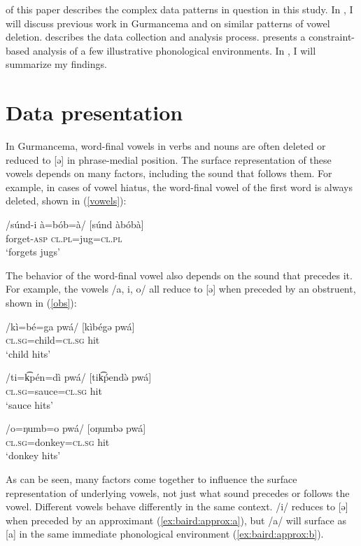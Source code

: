 \documentclass[output=paper,newtxmath,modfonts,nonflat,draftmode]{langsci/langscibook}
\begin{document}
 of this paper describes the complex data patterns in question in this study. In , I will discuss previous work in Gurmancema and on similar patterns 
of vowel deletion.  describes the data collection and analysis process.  presents a constraint-based analysis of a few illustrative phonological environments. In , I will summarize my findings. 

\section{Data presentation} \label{data}\label{sec:baird:2}
In Gurmancema, word-final vowels in verbs and nouns are often deleted or reduced to [ə] in phrase-medial position. The surface representation of these vowels depends on many factors, including the sound that follows them. For example, in cases of vowel hiatus, the word-final vowel of the first word is always deleted, shown in (\ref{vowels}):

\ea \label{vowels}
\gll /súnd-i à=bób=à/ \hspace{0.5cm} [súnd àbóbà]\\
forget-\textsc{asp} \textsc{cl.pl}=jug=\textsc{cl.pl}\\
\glt `forgets jugs'
\z

The behavior of the word-final vowel also depends on the sound that precedes it. For example, the vowels /a, i, o/ all reduce to [ə] when preceded by an obstruent, shown in (\ref{obs}):
  
\ea \label{obs}
\ea \gll /kì=bé=ga pwá/  \hspace{0.5cm} [kìbégə pwá] \\
 \textsc{cl.sg}=child=\textsc{cl.sg} hit\\
\glt `child hits'

\ex 
\gll /ti=k͡pén=dì pwá/ \hspace{0.5cm} [tik͡ṕendə̀ pwá]\\
\textsc{cl.sg}=sauce=\textsc{cl.sg} hit\\
\glt `sauce hits'

\ex
\gll /o=ŋumb=o pwá/ \hspace{0.4cm} [oŋumbə pwá]\\
\textsc{cl.sg}=donkey=\textsc{cl.sg} hit\\
\glt `donkey hits'
\z 
\z

As can be seen, many factors come together to influence the surface representation of underlying vowels, not just what sound precedes or follows the vowel. Different vowels behave differently in the same context. /i/ reduces to [ə] when preceded by an approximant (\ref{ex:baird:approx:a}), but /a/ will surface as [a] in the same immediate phonological environment (\ref{ex:baird:approx:b}). 
\end{document}
